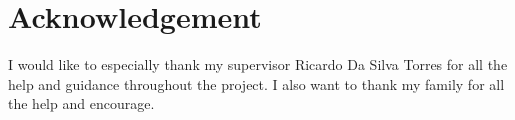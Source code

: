 \section*{Acknowledgement}
I would like to especially thank my supervisor Ricardo Da Silva Torres for all the help and guidance throughout the project. I also want to thank my family for all the help and encourage.